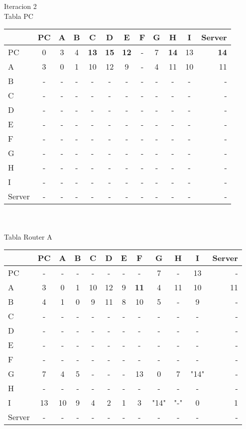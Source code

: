 \documentclass{article}
\begin{document}
\\
\\
Iteracion 2
\\
Tabla PC\\
\begin{tabular}{l*{10}{c}r}
              & PC & A & B & C & D & E & F  & G & H & I & Server \\
\hline
PC             & 0 & 3 & 4 &\bf{13}&\bf{15}&\bf{12}& - & 7 &\bf{14}& 13 &\bf{14}\\
A              & 3 & 0 & 1 & 10 & 12 & 9 & - & 4 & 11 & 10 & 11 \\
B              & - & - & - & - & - & - & - & - & - & - & - \\
C              & - & - & - & - & - & - & - & - & - & - & - \\
D              & - & - & - & - & - & - & - & - & - & - & - \\
E              & - & - & - & - & - & - & - & - & - & - & - \\
F              & - & - & - & - & - & - & - & - & - & - & - \\
G              & - & - & - & - & - & - & - & - & - & - & - \\
H              & - & - & - & - & - & - & - & - & - & - & - \\
I              & - & - & - & - & - & - & - & - & - & - & - \\
Server         & - & - & - & - & - & - & - & - & - & - & - \\	

\end{tabular}
\\
\\
Tabla Router A  \\
\begin{tabular}{l*{10}{c}r}
              & PC & A & B & C & D & E & F & G & H & I & Server \\
\hline
PC             & - & - & - & - & - & - & - & 7 & - & 13 & -\\
A              & 3 & 0 & 1 & 10 & 12 & 9 &\bf{11}& 4 & 11 & 10 & 11 \\
B              & 4 & 1 & 0 & 9 & 11	& 8 & 10 & 5 & - & 9 & -\\
C              & - & - & - & - & - & - & - & - & - & - & -\\
D              & - & - & - & - & - & - & - & - & - & - & -\\
E              & - & - & - & - & - & - & - & - & - & - & -\\
F              & - & - & - & - & - & - & - & - & - & - & -\\
G              & 7 & 4 & 5 & - & - & - & 13 & 0 & 7 & "14" & -\\
H              & - & - & - & - & - & - & - & - & - & - & -\\
I              & 13 & 10 & 9 & 4 & 2 & 1 & 3 & "14" & "-" & 0 & 1\\
Server         & - & - & - & - & - & - & - & - & - & - & -\\

\end{tabular}
\end{document}
